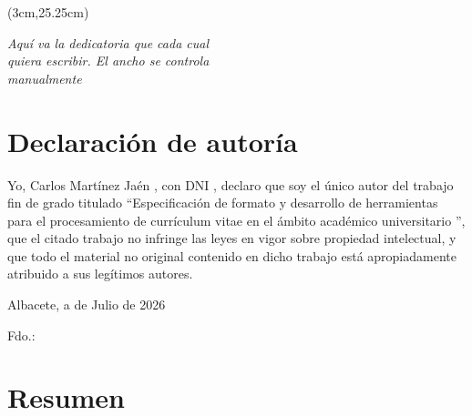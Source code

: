 \begin{textblock*}{\textwidth}(3cm,25.25cm) 
\begin{flushright}
{\fontsize{14pt}{4pt}\selectfont \fecha}
\end{flushright}
\end{textblock*}


\cleardoublepage
\thispagestyle{empty}

\vspace*{9cm}  
\begin{flushright} \em 
Aquí va la dedicatoria que cada cual \\ 
quiera escribir. El ancho se controla \\ 
manualmente
\end{flushright}


\cleardoublepage
\thispagestyle{plain}
\chapter*{Declaración de autoría}


Yo, \quad Carlos Martínez Jaén \quad, con DNI \quad \dniautor \quad, declaro que soy el único autor del trabajo fin de grado titulado ``\quad Especificación de formato y desarrollo de herramientas para el procesamiento de currículum vitae en el ámbito académico universitario \quad'', que el citado trabajo no infringe las leyes en vigor sobre propiedad intelectual, y que todo el material no original contenido en dicho trabajo está apropiadamente atribuido a sus legítimos autores.

\vspace*{2cm}
\begin{center}
Albacete, a  \quad de \quad Julio \quad de 2026

\vskip3cm

Fdo.: \autor
\end{center}


\cleardoublepage
\thispagestyle{plain}
\chapter*{Resumen}


